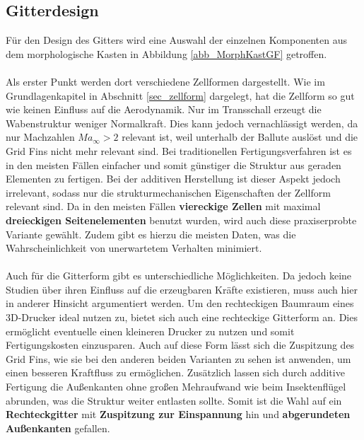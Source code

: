 \subsection{Gitterdesign}
Für den Design des Gitters wird eine Auswahl der einzelnen Komponenten aus dem morphologische Kasten in Abbildung \ref{abb_MorphKastGF} getroffen.
\\~\\
Als erster Punkt werden dort verschiedene Zellformen dargestellt. Wie im Grundlagenkapitel in Abschnitt \ref{sec_zellform} dargelegt, hat die Zellform so gut wie keinen Einfluss auf die Aerodynamik. Nur im Transschall erzeugt die Wabenstruktur weniger Normalkraft. Dies kann jedoch vernachlässigt werden, da nur Machzahlen $Ma_\infty >2$ relevant ist, weil unterhalb der Ballute auslöst und die Grid Fins nicht mehr relevant sind. Bei traditionellen Fertigungsverfahren ist es in den meisten Fällen einfacher und somit günstiger die Struktur aus geraden Elementen zu fertigen. Bei der additiven Herstellung ist dieser Aspekt jedoch irrelevant, sodass nur die strukturmechanischen Eigenschaften der Zellform relevant sind. Da in den meisten Fällen \textbf{viereckige Zellen} mit maximal \textbf{dreieckigen Seitenelementen} benutzt wurden, wird auch diese praxiserprobte Variante gewählt. Zudem gibt es hierzu die meisten Daten, was die Wahrscheinlichkeit von unerwartetem Verhalten minimiert.
\\~\\
Auch für die Gitterform gibt es unterschiedliche Möglichkeiten. Da jedoch keine Studien über ihren Einfluss auf die erzeugbaren Kräfte existieren, muss auch hier in anderer Hinsicht argumentiert werden. Um den rechteckigen Baumraum eines 3D-Drucker ideal nutzen zu, bietet sich auch eine rechteckige Gitterform an. Dies ermöglicht eventuelle einen kleineren Drucker zu nutzen und somit Fertigungskosten einzusparen. Auch auf diese Form lässt sich die Zuspitzung des Grid Fins, wie sie bei den anderen beiden Varianten zu sehen ist anwenden, um einen besseren Kraftfluss zu ermöglichen. Zusätzlich lassen sich durch additive Fertigung die Außenkanten ohne großen Mehraufwand wie beim Insektenflügel abrunden, was die Struktur weiter entlasten sollte. Somit ist die Wahl auf ein \textbf{Rechteckgitter} mit \textbf{Zuspitzung zur Einspannung} hin und \textbf{abgerundeten Außenkanten }gefallen.
\\~\\
